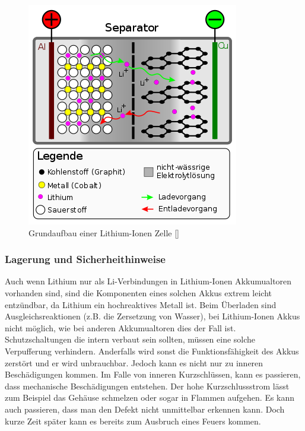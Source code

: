 \begin{figure}[H]
	\begin{center}
		\includegraphics[scale=0.5]{figures/Akku/350px-Li-Ion-Zelle_(CoO2-Carbon,_Schema).svg.png}
		\caption{Grundaufbau einer Lithium-Ionen Zelle [\cite{GrundaufbauLiionenZelle}]}
		\label{fig:Grundaufbau einer Lithium-Ionen Zelle}
	\end{center}
\end{figure}
\newpage

\subsubsection{Lagerung und Sicherheithinweise}
Auch wenn Lithium nur als Li-Verbindungen in Lithium-Ionen Akkumualtoren vorhanden sind, sind die Komponenten eines solchen Akkus extrem leicht entzündbar, da Lithium ein hochreaktives Metall ist. Beim Überladen sind Ausgleichsreaktionen (z.B. die Zersetzung von Wasser), bei Lithium-Ionen Akkus nicht möglich, wie bei anderen Akkumualtoren dies der Fall ist. Schutzschaltungen die intern verbaut sein sollten, müssen eine solche Verpufferung verhindern. Anderfalls wird sonst die Funktionsfähigkeit des Akkus zerstört und er wird unbrauchbar. 
Jedoch kann es nicht nur zu inneren Beschädigungen kommen. Im Falle von inneren Kurzschlüssen, kann es passieren, dass mechanische Beschädigungen entstehen. Der hohe Kurzschlussstrom lässt zum Beispiel das Gehäuse schmelzen oder sogar in Flammen aufgehen. Es kann auch passieren, dass man den Defekt nicht unmittelbar erkennen kann. Doch kurze Zeit später kann es bereits zum Ausbruch eines Feuers kommen.

